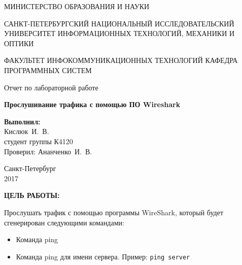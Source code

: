 \documentclass[14pt,a4paper]{extreport}
\newcommand{\header}[1]{%
{
\fontsize{16pt}{14pt}\selectfont
\begin{center}
\textbf{\MakeUppercase{#1}:}
\end{center}
}
}
\newcommand{\anan}{Ананченко~И.~В.}
\newcommand{\igork}{Кислюк~И.~В.}
\begin{document}
	\begin{titlepage}
	\begin{center}	
		\fontsize{14pt}{14pt}\selectfont
		МИНИСТЕРСТВО ОБРАЗОВАНИЯ И НАУКИ\\

		\vspace*{0.6\baselineskip}
		
		САНКТ-ПЕТЕРБУРГСКИЙ НАЦИОНАЛЬНЫЙ ИССЛЕДОВАТЕЛЬСКИЙ УНИВЕРСИТЕТ ИНФОРМАЦИОННЫХ ТЕХНОЛОГИЙ, МЕХАНИКИ И ОПТИКИ
		
		\vspace*{0.6\baselineskip}
		ФАКУЛЬТЕТ ИНФОКОММУНИКАЦИОННЫХ ТЕХНОЛОГИЙ
		КАФЕДРА ПРОГРАММНЫХ СИСТЕМ
	
		\vspace*{7\baselineskip}
		\fontsize{19pt}{18pt}\selectfont
		Отчет по лабораторной работе
		
		\fontsize{20pt}{18pt}\selectfont
		\textbf{Прослушивание трафика с помощью ПО Wireshark}\\
		\vspace*{1.15\baselineskip}
		\end{center}
	
	\vspace*{2\baselineskip}
	\begin{flushright}
	\fontsize{14pt}{14pt}\selectfont
	\textbf{Выполнил:}\\
	\igork\\
	студент группы К4120\\
	Проверил: \anan\\
	\end{flushright}
	
	\vspace{\fill}
	\begin{center}
	Санкт-Петербург\\
	2017
	\end{center}
	
\end{titlepage}

\newpage

\header{Цель работы}

\fontsize{14pt}{14pt}\selectfont

Прослушать трафик с помощью программы WireShark, который будет сгенерирован следующими командами:

\begin{itemize}
\item Команда ping
\item Команда ping для имени сервера. Пример: \verb|ping server|
\end{itemize}
\end{document}
